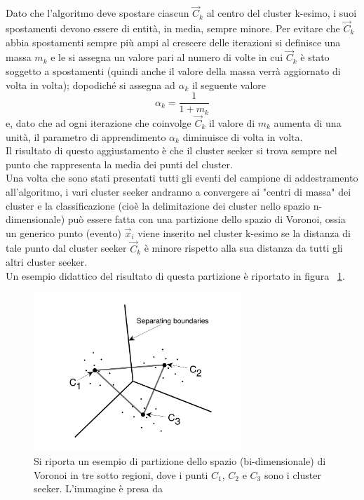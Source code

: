 Dato che l'algoritmo deve spostare ciascun $\vec{C}_k$ al centro del cluster k-esimo, i suoi spostamenti devono essere di entità, in media, sempre minore. Per evitare che $\vec{C}_k$ abbia spostamenti sempre più ampi al crescere delle iterazioni si definisce una massa $m_k$ e le si assegna un valore pari al numero di volte in cui $\vec{C}_k$ è stato soggetto a spostamenti (quindi anche il valore della massa verrà aggiornato di volta in volta); dopodiché si assegna ad $\alpha_k$ il seguente valore
\begin{equation}
\alpha_k = \frac{1}{1 + m_k}
\end{equation} 
e, dato che ad ogni iterazione che coinvolge $\vec{C}_k$ il valore di $m_k$ aumenta di una unità, il parametro di apprendimento $\alpha_k$ diminuisce di volta in volta. \\
Il risultato di questo aggiustamento è che il cluster seeker si trova sempre nel punto che rappresenta la media dei punti del cluster. \\
Una volta che sono stati presentati tutti gli eventi del campione di addestramento all'algoritmo, i vari cluster seeker andranno a convergere ai "centri di massa" dei cluster e la classificazione (cioè la delimitazione dei cluster nello spazio n-dimensionale) può essere fatta con una partizione dello spazio di Voronoi, ossia un generico punto (evento) $\vec{x}_i$ viene inserito nel cluster k-esimo se la distanza di tale punto dal cluster seeker $\vec{C}_k$ è minore rispetto alla sua distanza da tutti gli altri cluster seeker. \\
Un esempio didattico del risultato di questa partizione è riportato in figura ~\ref{Voronoi}.

\newpage

\begin{figure}[h!]
	\centering
	\includegraphics[width=0.70\textwidth]{figs/Voronoi.png}
	\caption{Si riporta un esempio di partizione dello spazio (bi-dimensionale) di Voronoi in tre sotto regioni, dove i punti $C_1$, $C_2$ e $C_3$ sono i cluster seeker. L'immagine è presa da \cite{IntroML}}
	\label{Voronoi}
\end{figure}

